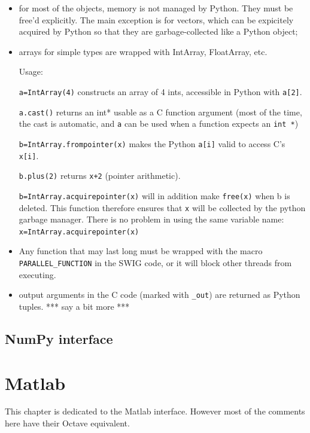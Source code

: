 \documentclass[a4paper,11pt,notitlepage,final,twoside]{report}
\newcommand{\tc}[1]{\texttt{#1}}
\begin{document}
\begin{itemize}
\item for most of the objects, memory is not managed by Python. They must be free'd explicitly. The main exception is for vectors, which can be expicitely acquired by Python so that they are garbage-collected like a Python object;
\item arrays for simple types are wrapped with IntArray, FloatArray, etc. 

  Usage:

      \tc{a=IntArray(4)} constructs an array of 4 ints, accessible in Python with \tc{a[2]}. 

      \tc{a.cast()} returns an int* usable as a C function argument (most of the time, the cast is automatic, and \tc{a} can be used when a function expects an \tc{int *})
      
      \tc{b=IntArray.frompointer(x)} makes the Python \tc{a[i]} valid to access C's \tc{x[i]}.

      \tc{b.plus(2)} returns \tc{x+2} (pointer arithmetic).

      \tc{b=IntArray.acquirepointer(x)} will in addition make \tc{free(x)} when b is deleted. This function therefore ensures that \tc{x} will be collected 
by the python garbage manager. There is no problem in using the same 
variable name: \tc{x=IntArray.acquirepointer(x)}

\item Any function that may last long must be wrapped with the macro \tc{PARALLEL\_FUNCTION} in the SWIG code, or it will block other threads from executing. 

\item output arguments in the C code (marked with \tc{\_out}) are returned as Python tuples. *** say a bit more ***
\end{itemize}


\section{NumPy interface}


\chapter{Matlab}

This chapter is dedicated to the Matlab interface. 
However most of the comments here have their Octave equivalent. 
\end{document}
